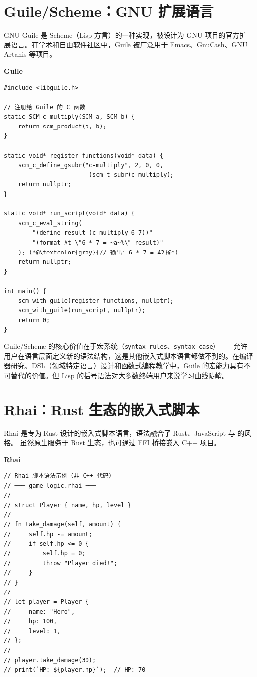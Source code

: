 \documentclass[12pt,a4paper,fontset=fandol]{ctexbook}
\newenvironment{compare}[1][]{%
  \begin{tcolorbox}[enhanced,breakable,
    colback=green!3!white,colframe=green!50!black,
    boxed title style={colback=green!50!black},
    attach boxed title to top left={yshift=-2mm,xshift=2mm},
    arc=2mm,boxrule=0.8mm,
    title={方案对比},#1]}%
  {\end{tcolorbox}}
\newcommand{\Tp}[1]{\texttt{#1}}
\newcommand{\guilelabel}{%
  \noindent\begin{tcolorbox}[colback=guileheadbg,coltext=white,
    sharp corners,boxrule=0pt,width=3.5em,height=1.4em,
    halign=center,valign=center,nobeforeafter,left=0pt,right=0pt,
    top=0pt,bottom=0pt]\small\bfseries Guile\end{tcolorbox}}
\newcommand{\rhailabel}{%
  \noindent\begin{tcolorbox}[colback=rhaiheadbg,coltext=white,
    sharp corners,boxrule=0pt,width=3.2em,height=1.4em,
    halign=center,valign=center,nobeforeafter,left=0pt,right=0pt,
    top=0pt,bottom=0pt]\small\bfseries Rhai\end{tcolorbox}}
\begin{document}
\section{Guile/Scheme：GNU 扩展语言}\label{sec:guile}

GNU Guile 是 Scheme（Lisp 方言）的一种实现，被设计为 GNU 项目的官方扩展语言。在学术和自由软件社区中，Guile 被广泛用于 Emacs、GnuCash、GNU Artanis 等项目。

\guilelabel
\begin{lstlisting}[style=cppstyle]
#include <libguile.h>

// 注册给 Guile 的 C 函数
static SCM c_multiply(SCM a, SCM b) {
    return scm_product(a, b);
}

static void* register_functions(void* data) {
    scm_c_define_gsubr("c-multiply", 2, 0, 0,
                        (scm_t_subr)c_multiply);
    return nullptr;
}

static void* run_script(void* data) {
    scm_c_eval_string(
        "(define result (c-multiply 6 7))"
        "(format #t \"6 * 7 = ~a~%\" result)"
    ); (*@\textcolor{gray}{// 输出: 6 * 7 = 42}@*)
    return nullptr;
}

int main() {
    scm_with_guile(register_functions, nullptr);
    scm_with_guile(run_script, nullptr);
    return 0;
}
\end{lstlisting}

\begin{compare}[title={Guile 的学术价值}]
Guile/Scheme 的核心价值在于宏系统（\Tp{syntax-rules}、\Tp{syntax-case}）——允许用户在语言层面定义新的语法结构，这是其他嵌入式脚本语言都做不到的。在编译器研究、DSL（领域特定语言）设计和函数式编程教学中，Guile 的宏能力具有不可替代的价值。但 Lisp 的括号语法对大多数终端用户来说学习曲线陡峭。
\end{compare}

\section{Rhai：Rust 生态的嵌入式脚本}\label{sec:rhai}

Rhai 是专为 Rust 设计的嵌入式脚本语言，语法融合了 Rust、JavaScript 与  的风格。
虽然原生服务于 Rust 生态，也可通过 FFI 桥接嵌入 C++ 项目。

\rhailabel
\begin{lstlisting}[style=cppstyle]
// Rhai 脚本语法示例（非 C++ 代码）
// ─── game_logic.rhai ───
//
// struct Player { name, hp, level }
//
// fn take_damage(self, amount) {
//     self.hp -= amount;
//     if self.hp <= 0 {
//         self.hp = 0;
//         throw "Player died!";
//     }
// }
//
// let player = Player {
//     name: "Hero",
//     hp: 100,
//     level: 1,
// };
//
// player.take_damage(30);
// print(`HP: ${player.hp}`);  // HP: 70
\end{lstlisting}
\end{document}
